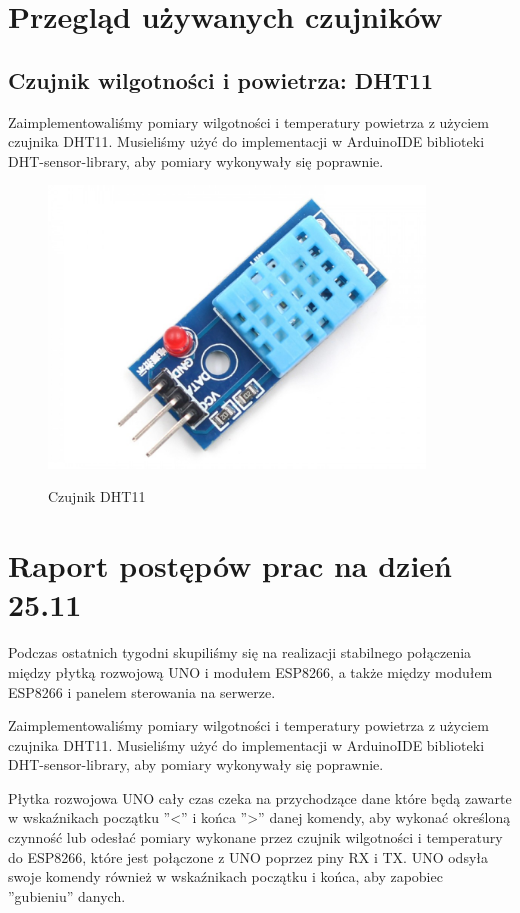 \documentclass[12pt]{article}
\begin{document}
\section{Przegląd używanych czujników}
\subsection{Czujnik wilgotności i powietrza: DHT11}
Zaimplementowaliśmy pomiary wilgotności i temperatury powietrza z użyciem czujnika DHT11. Musieliśmy użyć do implementacji w ArduinoIDE biblioteki DHT-sensor-library, aby pomiary wykonywały się poprawnie.
\begin{figure}[!h]
	\begin{center}
		{\includegraphics[width=10cm]{DHT11_photo.png}}
	\end{center}
	\caption{Czujnik DHT11}
\end{figure}



\section{Raport postępów prac na dzień 25.11}
Podczas ostatnich tygodni skupiliśmy się na realizacji stabilnego połączenia między płytką rozwojową UNO i modułem ESP8266, a także między modułem ESP8266 i panelem sterowania na serwerze.

Zaimplementowaliśmy pomiary wilgotności i temperatury powietrza z użyciem czujnika DHT11. Musieliśmy użyć do implementacji w ArduinoIDE biblioteki DHT-sensor-library, aby pomiary wykonywały się poprawnie.

Płytka rozwojowa UNO cały czas czeka na przychodzące dane które będą zawarte w wskaźnikach początku ''<'' i końca ''>'' danej komendy, aby wykonać określoną czynność lub odesłać pomiary wykonane przez czujnik wilgotności i temperatury do ESP8266, które jest połączone z UNO poprzez piny RX i TX. UNO odsyła swoje komendy również w wskaźnikach początku i końca, aby zapobiec ''gubieniu'' danych.
\end{document}
